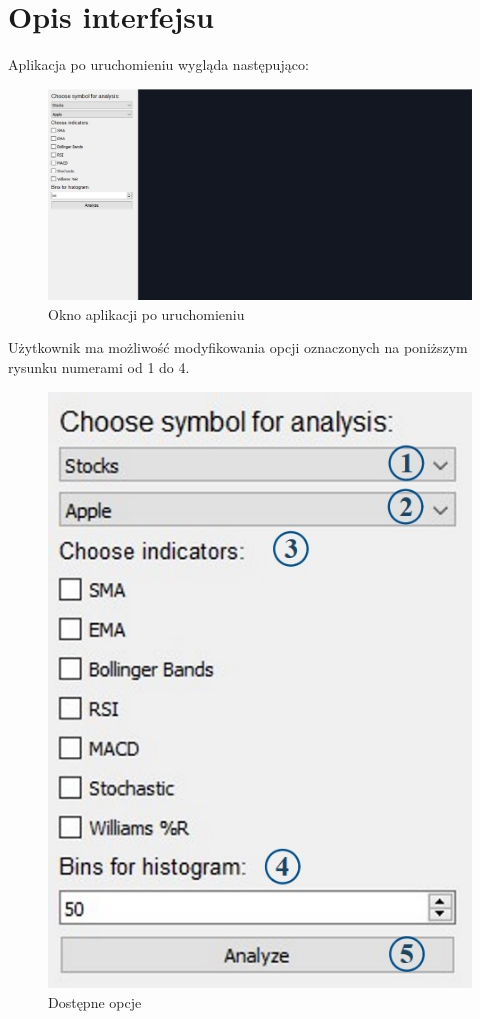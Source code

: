 \documentclass[12pt]{article}
\begin{document}
    \newpage


    \section{Opis interfejsu}\label{sec:opis-interfejsu}

    Aplikacja po uruchomieniu wygląda następująco:

    \begin{figure}[H]
        \centering
        \includegraphics[scale=0.4]{pics/po_odpaleniu}
        \caption{Okno aplikacji po uruchomieniu}\label{fig:figure}
	\end{figure}

    Użytkownik ma możliwość modyfikowania opcji oznaczonych na poniższym rysunku numerami od 1 do 4.

    \begin{figure}[H]
        \centering
        \includegraphics[scale=0.4]{pics/opcje}
        \caption{Dostępne opcje}\label{fig:figure2}
	\end{figure}
\end{document}
